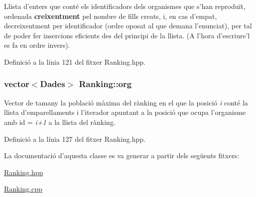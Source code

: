 Llista d'enters que conté els identificadors dels organismes que s'han reproduït, ordenada {\bfseries creixentment} pel nombre de fills creats, i, en cas d'empat, decreixentment per identificador (ordre oposat al que demana l'enunciat), per tal de poder fer insercions eficients des del principi de la llista. (A l'hora d'escriure'l es fa en ordre invers). 



Definició a la línia 121 del fitxer Ranking.\-hpp.

\hypertarget{class_ranking_a89de97e7542e8989c241113a4ee2498f}{
\subsubsection[{org}]{\setlength{\rightskip}{0pt plus 5cm}vector$<${\bf Dades}$>$ Ranking\-::org\hspace{0.3cm}{\ttfamily [private]}}}\label{class_ranking_a89de97e7542e8989c241113a4ee2498f}


Vector de tamany la població màxima del rànking en el que la posició {\itshape i} conté la llista d'emparellaments i l'iterador apuntant a la posició que ocupa l'organisme amb id = {\itshape i+1} a la llista del rànking. 



Definició a la línia 127 del fitxer Ranking.\-hpp.



La documentació d'aquesta classe es va generar a partir dels següents fitxers\-:\begin{DoxyCompactItemize}
\item 
\hyperlink{_ranking_8hpp}{Ranking.\-hpp}\item 
\hyperlink{_ranking_8cpp}{Ranking.\-cpp}\end{DoxyCompactItemize}
